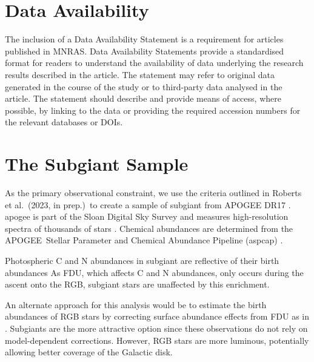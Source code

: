 \documentclass[fleqn,usenatbib]{mnras}
\newcommand{\citetjack}{Roberts et al.~(2023, in prep.)}
\newcommand{\apogee}{APOGEE}
\begin{document}
\section*{Data Availability}

 
The inclusion of a Data Availability Statement is a requirement for articles published in MNRAS. Data Availability Statements provide a standardised format for readers to understand the availability of data underlying the research results described in the article. The statement may refer to original data generated in the course of the study or to third-party data analysed in the article. The statement should describe and provide means of access, where possible, by linking to the data or providing the required accession numbers for the relevant databases or DOIs.







\appendix


\section{The Subgiant Sample}\label{sec:jack}

As the primary observational constraint, we use the criteria outlined in \citetjack~to create a sample of subgiant from \apogee{} DR17 \citep{apogee17}. apogee is part of the Sloan Digital Sky Survey and measures high-resolution spectra of thousands of stars \cite{sdss17}. Chemical abundances are determined from the \apogee\ Stellar Parameter and Chemical Abundance Pipeline ({\sc aspcap}) \citep{aspcap}.  


Photospheric C and N abundances in subgiant are reflective of their birth abundances \citep{gilroy89, korn+07, lind+08, souto+18, souto19} As FDU, which affects C and N abundances, only occurs during the ascent onto the RGB, subgiant stars are unaffected by this enrichment. 

An alternate approach for this analysis would be to estimate the birth abundances of RGB stars by correcting surface abundance effects from FDU as in \cite{vincenzo+21}. Subgiants are the more attractive option since these observations do not rely on model-dependent corrections. However, RGB stars are more luminous, potentially allowing better coverage of the Galactic disk.
\end{document}
